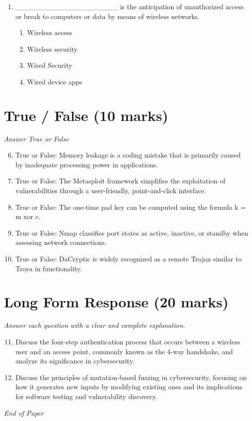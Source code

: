 \documentclass[12pt]{article}
\begin{document}
\begin{enumerate}[label=\arabic*.]
\begin{enumerate}[label=(\alph*)]
    \item Determine who the user is
\end{enumerate}
\item \_\_\_\_\_\_\_\_\_\_\_\_\_\_\_\_\_\_\_\_ is the anticipation of unauthorized access or break to computers or data by means of wireless networks.
\begin{enumerate}[label=(\alph*)]
    \item Wireless access
    \item Wireless security
    \item Wired Security
    \item Wired device apps
\end{enumerate}
\end{enumerate}

\section*{True / False (10 marks)}
\textit{Answer True or False}
\begin{enumerate}[label=\arabic*.]
\setcounter{enumi}{5}
\item True or False: Memory leakage is a coding mistake that is primarily caused by inadequate processing power in applications.
\item True or False: The Metasploit framework simplifies the exploitation of vulnerabilities through a user-friendly, point-and-click interface.
\item True or False: The one-time pad key can be computed using the formula k = m xor c.
\item True or False: Nmap classifies port states as active, inactive, or standby when assessing network connections.
\item True or False: DaCryptic is widely recognized as a remote Trojan similar to Troya in functionality.
\end{enumerate}

\section*{Long Form Response (20 marks)}
\textit{Answer each question with a clear and complete explanation.}
\begin{enumerate}[label=\arabic*.]
\setcounter{enumi}{10}
\item Discuss the four-step authentication process that occurs between a wireless user and an access point, commonly known as the 4-way handshake, and analyze its significance in cybersecurity.
\item Discuss the principles of mutation-based fuzzing in cybersecurity, focusing on how it generates new inputs by modifying existing ones and its implications for software testing and vulnerability discovery.
\end{enumerate}

\vfill
\noindent\textit{End of Paper}
\end{document}
